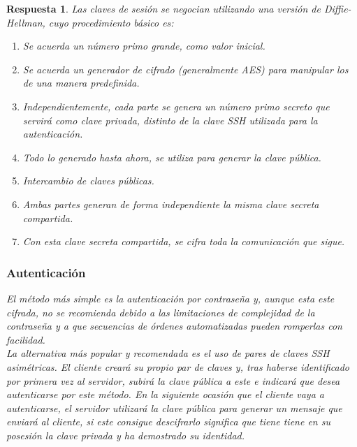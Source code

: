 \documentclass[
  a4paper,
  spanish,
  12pt,
]{scrartcl}
\theoremstyle{ejercicio-style}
\theoremstyle{remark-style}
\newtheorem*{sol}{Respuesta}
\theoremstyle{teorema-style}
\begin{document}
\begin{sol}
  Las claves de sesión se negocian utilizando una versión de Diffie-Hellman, cuyo procedimiento básico es:
  \begin{enumerate}
  \item Se acuerda un número primo grande, como valor inicial.
  \item Se acuerda un generador de cifrado (generalmente AES) para manipular los de una manera predefinida.
  \item Independientemente, cada parte se genera un número primo secreto que servirá como clave privada, distinto de la clave SSH utilizada para la autenticación.
  \item Todo lo generado hasta ahora, se utiliza para generar la clave pública.
  \item Intercambio de claves públicas.
  \item Ambas partes generan de forma independiente la misma clave secreta compartida.
  \item Con esta clave secreta compartida, se cifra toda la comunicación que sigue.
  \end{enumerate}


  \subsubsection*{Autenticación}

  El método más simple es la autenticación por contraseña y, aunque esta este cifrada, no se recomienda debido a las limitaciones de complejidad de la contraseña y a que secuencias de órdenes automatizadas pueden romperlas con facilidad.\\

  La alternativa más popular y recomendada es el uso de pares de claves SSH asimétricas. El cliente creará su propio par de claves y, tras haberse identificado por primera vez al servidor, subirá la clave pública a este e indicará que desea autenticarse por este método. En la siguiente ocasión que el cliente vaya a autenticarse, el servidor utilizará la clave pública para generar un mensaje que enviará al cliente, si este consigue descifrarlo significa que tiene tiene en su posesión la clave privada y ha demostrado su identidad.

\end{sol}
\end{document}
